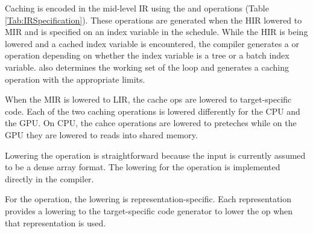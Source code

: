 Caching is encoded in the mid-level IR using the  and  operations (Table \ref{Tab:IRSpecification}). 
These operations are generated when the HIR lowered to MIR and  is specified on an 
index variable in the schedule. While the HIR is being lowered and a cached index variable is 
encountered, the compiler generates a  or  operation depending on 
whether the index variable is a tree or a batch index variable.
\Treebeard{} also determines the working set of the loop  
and generates a caching operation with the appropriate limits.


When the MIR is lowered to LIR, the cache ops are lowered to target-specific code. Each of 
the two caching operations is lowered differently for the CPU and the GPU. On CPU, the cahce operations are lowered to preteches while
on the GPU they are lowered to reads into shared memory.

Lowering the  operation is straightforward
because the input is currently assumed to be a dense
array format. The lowering for the  operation is implemented directly in the \Treebeard{} compiler.

For the  operation, the lowering is representation-specific. Each representation
provides a lowering to the target-specific code 
generator to lower the  op when
that representation is used.

